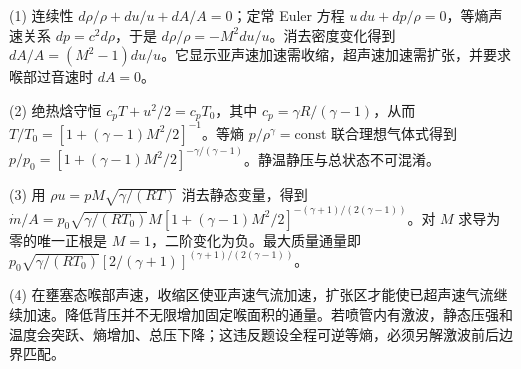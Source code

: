 (1) 连续性 \(d\rho/\rho+du/u+dA/A=0\)；定常 Euler 方程 \(u\,du+dp/\rho=0\)，等熵声速关系 \(dp=c^2d\rho\)，于是 \(d\rho/\rho=-M^2du/u\)。消去密度变化得到 \(dA/A=(M^2-1)du/u\)。它显示亚声速加速需收缩，超声速加速需扩张，并要求喉部过音速时 \(dA=0\)。

(2) 绝热焓守恒 \(c_pT+u^2/2=c_pT_0\)，其中 \(c_p=\gamma R/(\gamma-1)\)，从而 \(T/T_0=[1+(\gamma-1)M^2/2]^{-1}\)。等熵 \(p/\rho^\gamma=\mathrm{const}\) 联合理想气体式得到 \(p/p_0=[1+(\gamma-1)M^2/2]^{-\gamma/(\gamma-1)}\)。静温静压与总状态不可混淆。

(3) 用 \(\rho u=pM\sqrt{\gamma/(RT)}\) 消去静态变量，得到 \(\dot m/A=p_0\sqrt{\gamma/(RT_0)}M[1+(\gamma-1)M^2/2]^{-(\gamma+1)/(2(\gamma-1))}\)。对 \(M\) 求导为零的唯一正根是 \(M=1\)，二阶变化为负。最大质量通量即 \(p_0\sqrt{\gamma/(RT_0)}[2/(\gamma+1)]^{(\gamma+1)/(2(\gamma-1))}\)。

(4) 在壅塞态喉部声速，收缩区使亚声速气流加速，扩张区才能使已超声速气流继续加速。降低背压并不无限增加固定喉面积的通量。若喷管内有激波，静态压强和温度会突跃、熵增加、总压下降；这违反题设全程可逆等熵，必须另解激波前后边界匹配。
